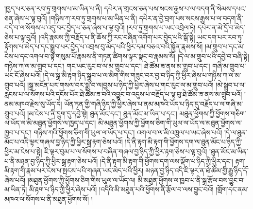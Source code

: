 །ཁྱད་པར་ཅན་རབ་ཏུ་གྲགས་པ་མ་ཡིན་པ་ནི། དཔེར་ན་གྲངས་ཅན་པས་སངས་རྒྱས་པ་ལ་བདག་ནི་སེམས་དཔའ་ཅན་ཞེས་པ་ལྟ་བུའོ། །གཉིས་ཀ་རབ་ཏུ་གྲགས་པ་མ་ཡིན་པ་ནི། དཔེར་ན་བྱེ་བྲག་པས་སངས་རྒྱས་པ་ལ་བདག་ནི་བདེ་བ་ལ་སོགས་པ་འདུ་བར་བྱེད་པ་ཅན་ཞེས་པ་ལྟ་བུའོ། །རབ་ཏུ་གྲགས་པ་ཡང་འབྲེལ་ཏེ། དཔེར་ན་མེ་དྲོ་བ་མེད་ཅེས་པ་ལྟ་བུའོ། །འདི་རྣམས་ཀྱི་བརྗོད་པ་ནི་ཆོས་ཀྱི་རང་བཞིན་འགོག་པར་བྱེད་པའི་སྒོ་སྟེ། ཡང་དག་པར་རབ་ཏུ་རྟོགས་པ་མེད་པ་དང་སྒྲུབ་པར་བྱེད་པ་འབྲས་བུ་མེད་པའི་ཕྱིར་དམ་བཅའ་བའི་སྐྱོན་རྣམས་སོ། །མ་གྲུབ་པ་དང་མ་ངེས་པ་དང་འགལ་བ་སྟེ་གསུམ་པོ་རྣམས་ནི་གཏན་ཚིགས་ལྟར་སྣང་བ་རྣམས་སོ། །དེ་ལ་མ་གྲུབ་པའི་དབྱེ་བ་བཞི་སྟེ། གཉིས་ཀ་ལ་མ་གྲུབ་པ་དང་། གང་ཡང་རུང་བ་ལ་མ་གྲུབ་པ་དང་། ཐེ་ཚོམ་ཟ་ནས་མ་གྲུབ་པ་དང་། གཞི་མ་གྲུབ་པ་ཡང་ངོ་ཞེས་པའོ། །དེ་ལ་སྒྲ་མི་རྟག་ཉིད་སྒྲུབ་པ་ལ་མིག་གིས་གཟུང་བར་བྱ་བ་ཉིད་ཀྱི་ཕྱིར་ཞེས་པ་གཉིས་ཀ་ལ་མ་གྲུབ་པའོ། །སྒྲ་མངོན་པར་གསལ་བར་སྨྲ་བ་ལ།བྱས་པ་ཉིད་ཀྱི་ཕྱིར་ཞེས་པ་གང་རུང་ལ་མ་གྲུབ་པའོ། །མེ་སྒྲུབ་པ་ལ་རླངས་པ་ལ་སོགས་པའི་དངོས་པོར་ཐེ་ཚོམ་ཟ་བའི་འབྱུང་བ་འདུས་པ་བརྗོད་པ་ལྟ་བུ་ཐེ་ཚོམ་ཟ་ནས་མ་གྲུབ་པའོ། །ནམ་མཁའ་རྗེས་སུ་ཡོད་དེ། ཡོན་ཏན་གྱི་གཞི་ཉིད་ཀྱི་ཕྱིར་ཞེས་པ་ནམ་མཁའི་ཡོད་པ་ཉིད་དུ་བརྗོད་པ་ལ་གཞི་མ་གྲུབ་པའོ། །མ་ངེས་པ་ནི་དྲུག་དུ་དབྱེ་སྟེ། ཐུན་མོང་དང་། ཐུན་མོང་མ་ཡིན་པ་དང་། མཐུན་ཕྱོགས་ཀྱི་ཕྱོགས་གཅིག་ལ་ཡོད་ལ་མི་མཐུན་ཕྱོགས་ལ་ཁྱད་པ་དང་། མི་མཐུན་ཕྱོགས་ཀྱི་ཕྱོགས་ཅིག་གི་ཡུལ་ལ་ཡོད་ལ་མཐུན་ཕྱོགས་ལ་ཁྱབ་པ་དང་། གཉིས་ཀའི་ཕྱོགས་ཅིག་གི་ཡུལ་ལ་ཡོད་པ་དང་། འགལ་བ་ལ་མི་འཁྲུལ་པ་ཡང་ཞེས་པའོ། །དེ་ལ་ཐུན་མོང་པ་འདི་ལྟར་གཞལ་བྱ་ཉིད་ཀྱི་ཕྱིར་སྒྲ་རྟག་ཅེས་པའོ། །དེ་ནི་རྟག་མི་རྟག་གི་ཕྱོགས་དག་ལ་ཐུན་མོང་པ་ཉིད་ཀྱི་ཕྱིར་མ་ངེས་པ་སྟེ། ཇི་ལྟར་བུམ་པ་ལ་སོགས་པ་བཞིན་གཞལ་བྱ་ཉིད་ཀྱི་ཕྱིར་རྟག་ཅེས་པ་ལྟ་བུའོ། །ཐུན་མོང་མ་ཡིན་པ་ནི་མཉན་བྱ་ཉིད་ཀྱི་ཕྱིར་སྒྲ་རྟག་ཅེས་པའོ། །དེ་ནི་རྟག་མི་རྟག་གི་ཕྱོགས་དག་ལས་ལྡོག་པ་ཉིད་ཀྱི་ཕྱིར་དང་། རྟག་མི་རྟག་གི་རྣམ་པར་ངེས་པ་སྤངས་པའི་གཞན་ཡང་མེད་པའི་ཕྱིར། མཉན་བྱ་ཉིད་འདི་ཇི་ལྟར་ན་ཐེ་ཚོམ་གྱི་རྒྱུ་ཉིད་དོ་ཞེས་པའོ། །མཐུན་ཕྱོགས་ཀྱི་ཕྱོགས་ཅིག་གིས་ཡུལ་ལ་ཡོད་ལ། མི་མཐུན་ཕྱོགས་ལ་ཁྱབ་པ་ནི་སྒྲ་རྩོལ་བས་བྱུང་བ་མ་ཡིན་ཏེ། མི་རྟག་པ་ཉིད་ཀྱི་ཕྱིར་ཞེས་པའོ། །འདིའི་མི་མཐུན་པའི་ཕྱོགས་ནི་རྩོལ་བ་ལས་བྱུང་བའོ། །གློག་དང་ནམ་མཁའ་ལ་སོགས་པ་ནི་མཐུན་ཕྱོགས་སོ། །
